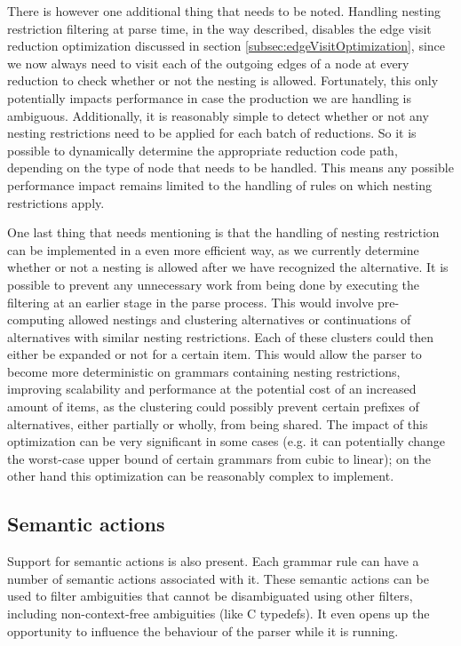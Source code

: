 \documentclass[a4paper,10pt]{article}
\begin{document}
There is however one additional thing that needs to be noted. Handling nesting restriction filtering at parse time, in the way described, disables the edge visit reduction optimization discussed in section \ref{subsec:edgeVisitOptimization}, since we now always need to visit each of the outgoing edges of a node at every reduction to check whether or not the nesting is allowed. Fortunately, this only potentially impacts performance in case the production we are handling is ambiguous. Additionally, it is reasonably simple to detect whether or not any nesting restrictions need to be applied for each batch of reductions. So it is possible to dynamically determine the appropriate reduction code path, depending on the type of node that needs to be handled. This means any possible performance impact remains limited to the handling of rules on which nesting restrictions apply.

One last thing that needs mentioning is that the handling of nesting restriction can be implemented in a even more efficient way, as we currently determine whether or not a nesting is allowed after we have recognized the alternative. It is possible to prevent any unnecessary work from being done by executing the filtering at an earlier stage in the parse process. This would involve pre-computing allowed nestings and clustering alternatives or continuations of alternatives with similar nesting restrictions. Each of these clusters could then either be expanded or not for a certain item. This would allow the parser to become more deterministic on grammars containing nesting restrictions, improving scalability and performance at the potential cost of an increased amount of items, as the clustering could possibly prevent certain prefixes of alternatives, either partially or wholly, from being shared. The impact of this optimization can be very significant in some cases (e.g. it can potentially change the worst-case upper bound of certain grammars from cubic to linear); on the other hand this optimization can be reasonably complex to implement.

\subsection{Semantic actions}

Support for semantic actions is also present. Each grammar rule can have a number of semantic actions associated with it. These semantic actions can be used to filter ambiguities that cannot be disambiguated using other filters, including non-context-free ambiguities (like C typedefs). It even opens up the opportunity to influence the behaviour of the parser while it is running.
\end{document}
